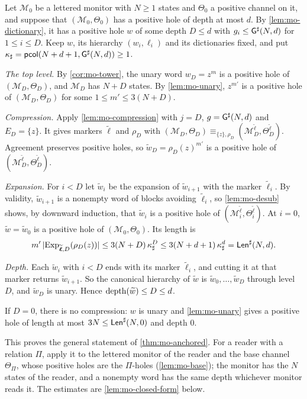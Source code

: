 Let $\mathcal M_0$ be a lettered monitor with $N\ge1$ states and $\Theta_0$ a
positive channel on it, and suppose that $(\mathcal M_0,\Theta_0)$ has a
positive hole of depth at most $d$. By \cref{lem:mo-dictionary}, it has a
positive hole $w$ of some depth $D\le d$ with $g_i\le\mathsf{G}^{\sharp}(N,d)$ for $1\le
i\le D$. Keep $w$, its hierarchy $(w_i,\ell_i)$ and its dictionaries fixed, and
put $\kappa_\sharp=\mathsf{pcol}(N+d+1,\mathsf{G}^{\sharp}(N,d))\ge1$.

\emph{The top level.} By \cref{cor:mo-tower}, the unary word $w_D=z^m$ is a
positive hole of $(\mathcal M_D,\Theta_D)$, and $\mathcal M_D$ has $N+D$ states.
By \cref{lem:mo-unary}, $z^{m'}$ is a positive hole of $(\mathcal
M_D,\Theta_D)$ for some $1\le m'\le3(N+D)$.

\emph{Compression.} Apply \cref{lem:mo-compression} with $j=D$,
$g=\mathsf{G}^{\sharp}(N,d)$ and $E_D=\{z\}$. It gives markers $\widetilde{\boldsymbol\ell}$
and $\rho_D$ with $(\mathcal M_D,\Theta_D)\equiv_{\{z\},\rho_D}(\mathcal
M^{\widetilde{\boldsymbol\ell}}_D,\Theta^{\widetilde{\boldsymbol\ell}}_D)$.
Agreement preserves positive holes, so $\widetilde w_D=\rho_D(z)^{m'}$ is a
positive hole of $(\mathcal M^{\widetilde{\boldsymbol\ell}}_D,
\Theta^{\widetilde{\boldsymbol\ell}}_D)$.

\emph{Expansion.} For $i<D$ let $\widetilde w_i$ be the expansion of
$\widetilde w_{i+1}$ with the marker $\widetilde\ell_i$. By validity,
$\widetilde w_{i+1}$ is a nonempty word of blocks avoiding $\widetilde\ell_i$, so
\cref{lem:mo-desub} shows, by downward induction, that $\widetilde w_i$ is a
positive hole of $(\mathcal M^{\widetilde{\boldsymbol\ell}}_i,
\Theta^{\widetilde{\boldsymbol\ell}}_i)$. At $i=0$, $\widetilde w=\widetilde w_0$
is a positive hole of $(\mathcal M_0,\Theta_0)$. Its length is
\[
 m'\,\lvert \operatorname{Exp}_{\widetilde{\boldsymbol\ell},D}(\rho_D(z))\rvert
 \le3(N+D)\,\kappa_\sharp^D\le3(N+d+1)\,\kappa_\sharp^d=\mathsf{Len}^{\sharp}(N,d).
\]

\emph{Depth.} Each $\widetilde w_i$ with $i<D$ ends with its marker
$\widetilde\ell_i$, and cutting it at that marker returns $\widetilde w_{i+1}$.
So the canonical hierarchy of $\widetilde w$ is $\widetilde w_0,\ldots,
\widetilde w_D$ through level $D$, and $\widetilde w_D$ is unary. Hence
$\operatorname{depth}(\widetilde w)\le D\le d$.

If $D=0$, there is no compression: $w$ is unary and \cref{lem:mo-unary} gives a
positive hole of length at most $3N\le\mathsf{Len}^{\sharp}(N,0)$ and depth $0$.

This proves the general statement of \cref{thm:mo-anchored}. For a reader with
a relation $\Pi$, apply it to the lettered monitor of the reader and the base
channel $\Theta_\Pi$, whose positive holes are the $\Pi$-holes
(\cref{lem:mo-base}); the monitor has the $N$ states of the reader, and a
nonempty word has the same depth whichever monitor reads it. The estimates are
\cref{lem:mo-closed-form} below.

